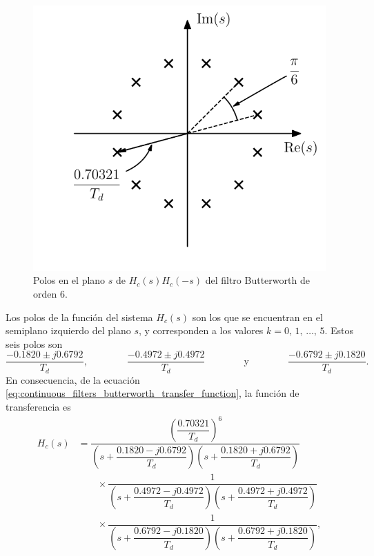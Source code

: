 \documentclass[a4paper]{report}
\begin{document}
\begin{figure}[!htb]
  \begin{minipage}[c]{0.45\textwidth}
    \includegraphics[width=\textwidth]{figuras/filter_design_example_07_02_poles.pdf}
  \end{minipage}\hfill
  \begin{minipage}[c]{0.45\textwidth}
    \caption{
      Polos en el plano \(s\) de \(H_c(s)H_c(-s)\) del filtro Butterworth de orden 6.
    }\label{fig:filter_design_example_07_02_poles}
  \end{minipage}
\end{figure}
Los polos de la función del sistema \(H_c(s)\) son los que se encuentran en el semiplano izquierdo del plano \(s\), y corresponden a los valores \(k=0,\,1,\,\dots,\,5\). Estos seis polos son
\begin{equation}\label{eq:filter_design_example_07_02_Hs_poles}
 \frac{-0.1820\pm j0.6792}{T_d},
 \qquad\qquad
 \frac{-0.4972\pm j0.4972}{T_d}
 \qquad\qquad\textrm{y}\qquad\qquad
 \frac{-0.6792\pm j0.1820}{T_d}. 
\end{equation}
En consecuencia, de la ecuación \ref{eq:continuous_filters_butterworth_transfer_function}, la función de transferencia es
\begin{equation}
 \begin{aligned}\label{eq:filter_design_example_07_02_Hs}
  H_c(s)&=\dfrac{\left(\dfrac{0.70321}{T_d}\right)^6}
   {\left(s+\dfrac{0.1820-j0.6792}{T_d}\right)\left(s+\dfrac{0.1820+j0.6792}{T_d}\right)}\\
  &\qquad\times\dfrac{1}{\left(s+\dfrac{0.4972-j0.4972}{T_d}\right)\left(s+\dfrac{0.4972+j0.4972}{T_d}\right)}\\
  &\qquad\times\dfrac{1}{\left(s+\dfrac{0.6792-j0.1820}{T_d}\right)\left(s+\dfrac{0.6792+j0.1820}{T_d}\right)},  
 \end{aligned}
\end{equation}
\end{document}
